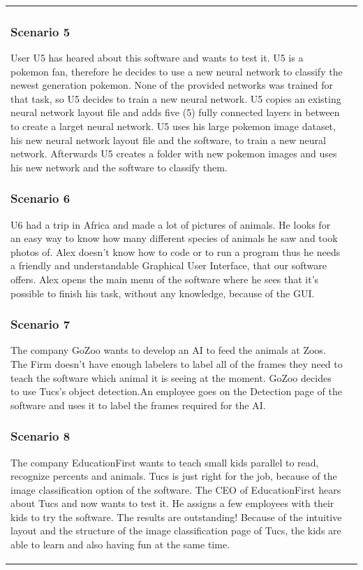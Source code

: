\documentclass[parskip=full]{scrartcl}
\begin{document}
\begin{tabular}{p{2cm}p{12cm}}
\subsubsection{Scenario 5}
User U5 has heared about this software and wants to test it.
U5 is a pokemon fan, therefore he decides to use a new neural network to classify the newest generation pokemon. None of the provided networks was trained for that task, so U5 decides to train a new neural network. U5 copies an existing neural network layout file and adds five (5) fully connected layers in between to create a larget neural network. U5 uses his large pokemon image dataset, his new neural network layout file and the software, to train a new neural network. 
Afterwards U5 creates a folder with new pokemon images and uses his new network and the software to classify them.
\subsubsection{Scenario 6}
U6 had a trip in Africa and made a lot of pictures of animals. He looks for an easy way to know how many different species of animals he saw and took photos of. Alex doesn't know how to code or to run a program thus he needs a friendly and understandable Graphical User Interface, that our software offers. Alex opens the main menu of the software where he sees that it's possible to finish his task, without any knowledge, because of the GUI. 
\subsubsection{Scenario 7}
The company GoZoo wants to develop an AI to feed the animals at Zoos. The Firm doesn't have enough labelers to label all of the frames they need to teach the software which animal it is seeing at the moment. GoZoo decides to use Tucs's object detection.An employee goes on the Detection page of the software and uses it to label the frames required for the AI.
\clearpage
\subsubsection{Scenario 8}
The company EducationFirst wants to teach small kids parallel to read, recognize percents and animals. Tucs is just right for the job, because of the \gls{image classification} option of the software. The CEO of EducationFirst hears about Tucs and now wants to test it. He assigns a few employees with their kids to try the software. The results are outstanding! Because of the intuitive layout and the structure of the \gls{image classification} page of Tucs, the kids are able to learn and also having fun at the same time.
\clearpage

\end{tabular}
\end{document}
